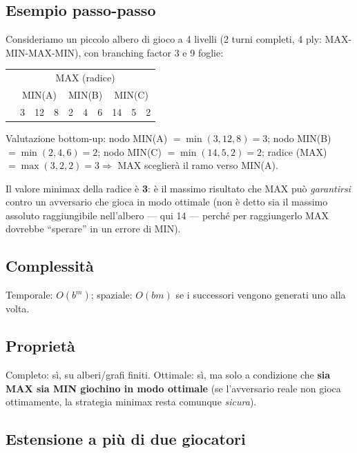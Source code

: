 \documentclass[11pt,a4paper]{report}
\begin{document}
\subsection*{Esempio passo-passo}

Consideriamo un piccolo albero di gioco a 4 livelli (2 turni completi, 4 ply: MAX-MIN-MAX-MIN), con branching factor 3 e 9 foglie:

\begin{center}
\begin{tabular}{@{}cccccccccc@{}}
& \multicolumn{9}{c}{MAX (radice)} \\
& \multicolumn{3}{c}{MIN(A)} & \multicolumn{3}{c}{MIN(B)} & \multicolumn{3}{c}{MIN(C)} \\
& 3 & 12 & 8 & 2 & 4 & 6 & 14 & 5 & 2 \\
\end{tabular}
\end{center}

Valutazione bottom-up: nodo MIN(A) $= \min(3,12,8) = 3$; nodo MIN(B) $=\min(2,4,6)=2$; nodo MIN(C) $=\min(14,5,2)=2$; radice (MAX) $=\max(3,2,2)=3 \Rightarrow$ MAX sceglierà il ramo verso MIN(A).

Il valore minimax della radice è \textbf{3}: è il massimo risultato che MAX può \emph{garantirsi} contro un avversario che gioca in modo ottimale (non è detto sia il massimo assoluto raggiungibile nell'albero --- qui 14 --- perché per raggiungerlo MAX dovrebbe ``sperare'' in un errore di MIN).

\subsection*{Complessità}

Temporale: $O(b^m)$; spaziale: $O(bm)$ se i successori vengono generati uno alla volta.

\subsection*{Proprietà}

Completo: sì, su alberi/grafi finiti. Ottimale: sì, ma solo a condizione che \textbf{sia MAX sia MIN giochino in modo ottimale} (se l'avversario reale non gioca ottimamente, la strategia minimax resta comunque \emph{sicura}).

\subsection*{Estensione a più di due giocatori}
\end{document}
